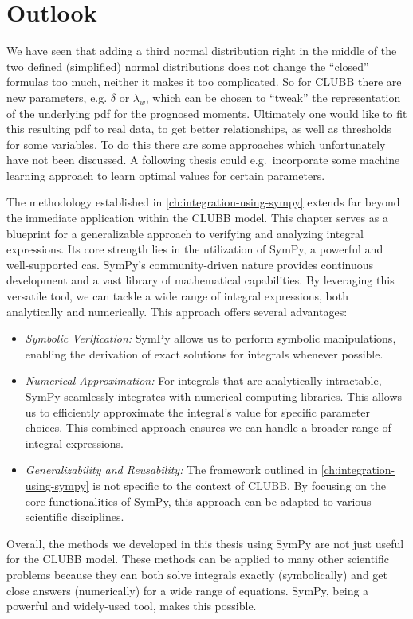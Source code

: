 \chapter{Outlook}\label{ch:outlook}

We have seen that adding a third normal distribution right in the middle of the two defined (simplified) normal distributions does not change the \enquote{closed} formulas too much, neither it makes it too complicated.
So for \gls{CLUBB} there are new parameters, e.g. $\delta$ or $\lambda_w$, which can be chosen to \enquote{tweak} the representation of the underlying \gls{pdf} for the prognosed moments.
Ultimately one would like to fit this resulting \gls{pdf} to real data, to get better relationships, as well as thresholds for some variables.
To do this there are some approaches which unfortunately have not been discussed.
A following thesis could e.g.\ incorporate some machine learning approach to learn optimal values for certain parameters.

The methodology established in \cref{ch:integration-using-sympy} extends far beyond the immediate application within the \gls{CLUBB} model.
This chapter serves as a blueprint for a generalizable approach to verifying and analyzing integral expressions.
Its core strength lies in the utilization of SymPy, a powerful and well-supported \gls{cas}.
SymPy's community-driven nature provides continuous development and a vast library of mathematical capabilities.
By leveraging this versatile tool, we can tackle a wide range of integral expressions, both analytically and numerically.
This approach offers several advantages:
\begin{itemize}
    \item \emph{Symbolic Verification:}
    SymPy allows us to perform symbolic manipulations, enabling the derivation of exact solutions for integrals whenever possible.
    \item \emph{Numerical Approximation:}
    For integrals that are analytically intractable, SymPy seamlessly integrates with numerical computing libraries.
    This allows us to efficiently approximate the integral's value for specific parameter choices.
    This combined approach ensures we can handle a broader range of integral expressions.
    \item \emph{Generalizability and Reusability:}
    The framework outlined in \cref{ch:integration-using-sympy} is not specific to the context of \gls{CLUBB}.
    By focusing on the core functionalities of SymPy, this approach can be adapted to various scientific disciplines.
\end{itemize}
Overall, the methods we developed in this thesis using SymPy are not just useful for the \gls{CLUBB} model.
These methods can be applied to many other scientific problems because they can both solve integrals exactly (symbolically) and get close answers (numerically) for a wide range of equations.
SymPy, being a powerful and widely-used tool, makes this possible.